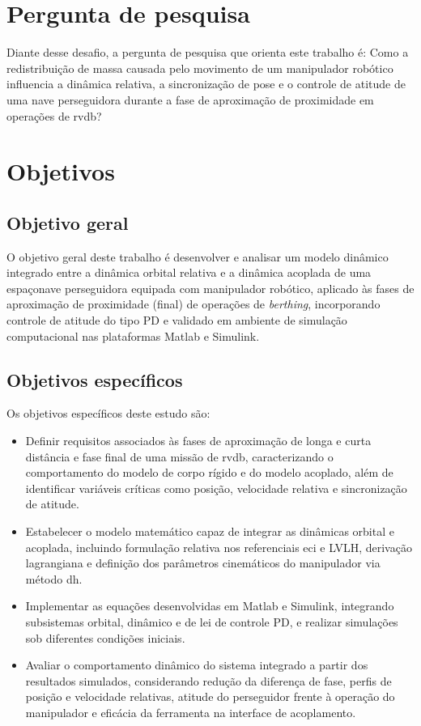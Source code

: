 \section{Pergunta de pesquisa}

Diante desse desafio, a pergunta de pesquisa que orienta este trabalho é: Como a redistribuição de massa causada pelo movimento de um manipulador robótico influencia a dinâmica relativa, a sincronização de pose e o controle de atitude de uma nave perseguidora durante a fase de aproximação de proximidade em operações de \gls{rvdb}?

\section{Objetivos}

\subsection{Objetivo geral}

O objetivo geral deste trabalho é desenvolver e analisar um modelo dinâmico integrado entre a dinâmica orbital relativa e a dinâmica acoplada de uma espaçonave perseguidora equipada com manipulador robótico, aplicado às fases de aproximação de proximidade (final) de operações de \textit{berthing}, incorporando controle de atitude do tipo PD e validado em ambiente de simulação computacional nas plataformas Matlab e Simulink.

\subsection{Objetivos específicos}

Os objetivos específicos deste estudo são:

\begin{itemize}
    \item Definir requisitos associados às fases de aproximação de longa e curta distância e fase final de uma missão de \gls{rvdb}, caracterizando o comportamento do modelo de corpo rígido e do modelo acoplado, além de identificar variáveis críticas como posição, velocidade relativa e sincronização de atitude.
    \item Estabelecer o modelo matemático capaz de integrar as dinâmicas orbital e acoplada, incluindo formulação relativa nos referenciais \gls{eci} e LVLH, derivação lagrangiana e definição dos parâmetros cinemáticos do manipulador via método \gls{dh}.
    \item Implementar as equações desenvolvidas em Matlab e Simulink, integrando subsistemas orbital, dinâmico e de lei de controle PD, e realizar simulações sob diferentes condições iniciais.
    \item Avaliar o comportamento dinâmico do sistema integrado a partir dos resultados simulados, considerando redução da diferença de fase, perfis de posição e velocidade relativas, atitude do perseguidor frente à operação do manipulador e eficácia da ferramenta na interface de acoplamento.
\end{itemize}

